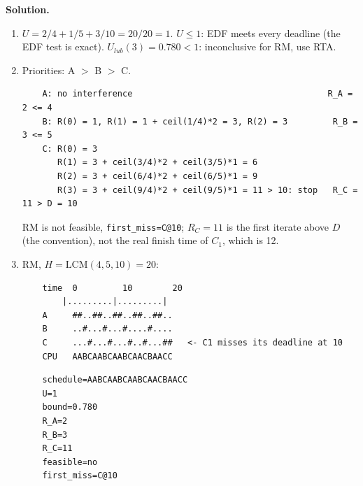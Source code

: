 \textbf{Solution.}
\begin{enumerate}
    \item $U = 2/4 + 1/5 + 3/10 = 20/20 = 1$. $U \le 1$: EDF meets every deadline (the EDF test is exact). $U_{lub}(3) = 0.780 < 1$: inconclusive for RM, use RTA.
    \item Priorities: A $>$ B $>$ C.
\begin{verbatim}
    A: no interference                                       R_A = 2 <= 4
    B: R(0) = 1, R(1) = 1 + ceil(1/4)*2 = 3, R(2) = 3         R_B = 3 <= 5
    C: R(0) = 3
       R(1) = 3 + ceil(3/4)*2 + ceil(3/5)*1 = 6
       R(2) = 3 + ceil(6/4)*2 + ceil(6/5)*1 = 9
       R(3) = 3 + ceil(9/4)*2 + ceil(9/5)*1 = 11 > 10: stop   R_C = 11 > D = 10
\end{verbatim}
    RM is not feasible, \texttt{first\_miss=C@10}; $R_C = 11$ is the first iterate above $D$ (the convention), not the real finish time of $C_1$, which is 12.
    \item RM, $H = \mathrm{LCM}(4, 5, 10) = 20$:
\begin{verbatim}
    time  0         10        20
        |.........|.........|
    A     ##..##..##..##..##..
    B     ..#...#...#....#....
    C     ...#...#...#..#...##   <- C1 misses its deadline at 10
    CPU   AABCAABCAABCAACBAACC
\end{verbatim}

\begin{verbatim}
    schedule=AABCAABCAABCAACBAACC
    U=1
    bound=0.780
    R_A=2
    R_B=3
    R_C=11
    feasible=no
    first_miss=C@10
\end{verbatim}


\end{enumerate}
